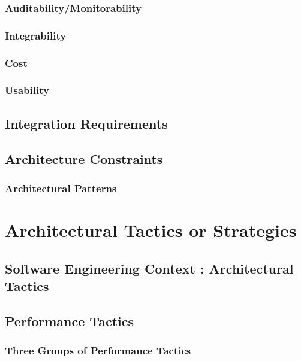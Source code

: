 \documentclass[11pt,fleqn]{book} %
\begin{document}
		\subsection{Auditability/Monitorability}
		\subsection{Integrability}
		\subsection{Cost}
		\subsection{Usability}
		
	\section{Integration Requirements}
	
	\section{Architecture Constraints}
		\subsection{Architectural Patterns}



\chapter{Architectural Tactics or Strategies}

\section{Software Engineering Context : Architectural Tactics}
\section{Performance Tactics}
	\subsection{Three Groups of Performance Tactics}
\end{document}
